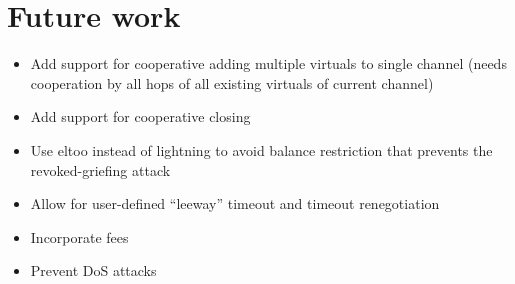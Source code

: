 \section{Future work}
  \begin{itemize}
    \item Add support for cooperative adding multiple virtuals to single channel
    (needs cooperation by all hops of all existing virtuals of current channel)
    \item Add support for cooperative closing
    \item Use eltoo instead of lightning to avoid balance restriction that
    prevents the revoked-griefing attack
    \item Allow for user-defined ``leeway'' timeout and timeout renegotiation
    \item Incorporate fees
    \item Prevent DoS attacks
  \end{itemize}
